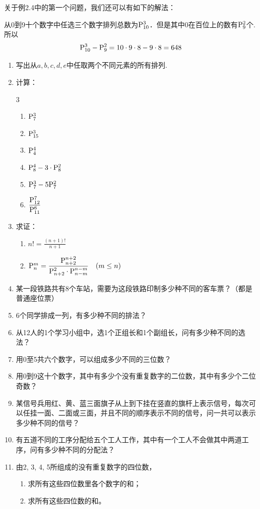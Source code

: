 关于例2.4中的第一个问题，我们还可以有如下的解法：

从0到9十个数字中任选三个数字排列总数为${\rm P}^{3}_{10}$．但是其中0在百位上的数有${\rm P}^{2}_{9}$个. 所以
\[{\rm P}^{3}_{10}-{\rm P}^{2}_{9}=10\cdot 9\cdot 8-9\cdot 8=648\]

\begin{ex}
\begin{enumerate}
    \item 写出从$a,b,c,d,e$中任取两个不同元素的所有排列.
    \item 计算：
\begin{multicols}{3}
\begin{enumerate}[(1)]
    \item ${\rm P}^{3}_{7}$
    \item ${\rm P}^{3}_{15}$
    \item ${\rm P}^{4}_{4}$
    \item ${\rm P}^{4}_{8}-3\cdot{\rm P}^{2}_{8}$
    \item ${\rm P}^{3}_{7}-5{\rm P}^{2}_{7}$
    \item $\dfrac{{\rm P}^{7}_{12}}{{\rm P}^{6}_{11}}$
\end{enumerate}
\end{multicols}

\item 求证：
\begin{enumerate}[(1)]
    \item $n!=\frac{(n+1)!}{n+1}$
    \item ${\rm P}^{m}_{n}=\dfrac{{\rm P}^{n+2}_{n+2}}{{\rm P}^{2}_{n+2}\cdot {\rm P}^{n-m}_{n-m}}\quad (m\le n)$
\end{enumerate}

\item 某一段铁路共有8个车站，需要为这段铁路印制多少种不同的客车票？（都是普通座位票）
\item 6个同学排成一列，有多少种不同的排法？
\item 从12人的1个学习小组中，选1个正组长和1个副组长，问有多少种不同的选法？
\item 用0至5共六个数字，可以组成多少不同的三位数？
\item 用0到9这十个数字，其中有多少个没有重复数字的二位数，其中有多少个二位奇数？
\item 某信号兵用红、黄、蓝三面旗子从上到下挂在竖直的旗杆上表示信号，每次可以任挂一面、二面或三面，并且不同的顺序表示不同的信号，问一共可以表示多少种不同的信号？
\item 有五道不同的工序分配给五个工人工作，其中有一个工人不会做其中两道工序，问有多少种不同的分配法？
\item 由2, 3, 4, 5所组成的没有重复数字的四位数，
\begin{enumerate}[(1)]
\item 求所有这些四位数里各个数字的和；
\item 求所有这些四位数的和。
\end{enumerate}
\end{enumerate}
\end{ex}

